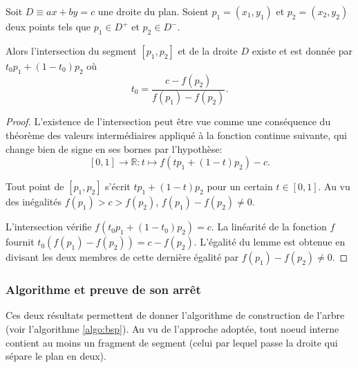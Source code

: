 \begin{lem}
  Soit $D\equiv ax + by = c$ une droite du plan. Soient $p_1 = (x_1, y_1)$
  et $p_2 = (x_2, y_2)$ deux points tels que $p_1\in D^+$ et $p_2\in D^-$.

  Alors l'intersection du segment $[p_1, p_2]$ et de la droite $D$
  existe et est donnée par $t_0p_1 + (1-t_0)p_2$
  où $$t_0 = \frac{c-f(p_2)}{f(p_1)-f(p_2)}.$$
\end{lem}
\begin{proof}
  L'existence de l'intersection peut être vue comme une conséquence
  du théorème des valeurs intermédiaires appliqué à la fonction
  continue suivante, qui change bien de signe en ses bornes
  par l'hypothèse:
  $$[0, 1]\to\mathbb R: t\mapsto f(tp_1 + (1 - t) p_2)- c.$$

  Tout point de $[p_1, p_2]$ s'écrit $tp_1 + (1-t)p_2$ pour un certain
  $t\in [0, 1]$. Au vu des inégalités $f(p_1)>c>f(p_2)$,
  $f(p_1)- f(p_2)\neq 0$.

  L'intersection vérifie $f(t_0p_1 + (1-t_0)p_2) = c$. La linéarité de la
  fonction $f$ fournit $t_0(f(p_1) - f(p_2)) = c - f(p_2)$. L'égalité
  du lemme est  obtenue en divisant les deux membres
  de cette dernière égalité par $f(p_1) - f(p_2)\neq 0$.
\end{proof}
\subsubsection*{Algorithme et preuve de son arrêt}
Ces deux résultats permettent de donner l'algorithme de construction de
l'arbre (voir l'algorithme \ref{algo:bsp}). Au vu de l'approche adoptée,
tout noeud interne contient au moins un fragment de segment (celui
par lequel passe la droite qui sépare le plan en deux).

